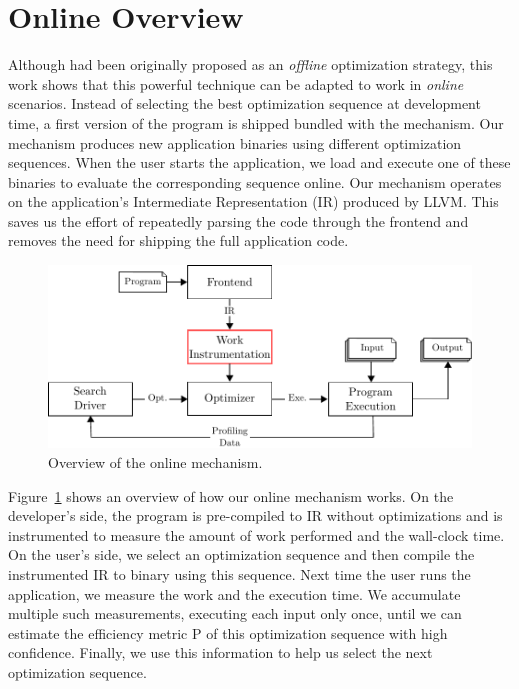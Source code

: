 \section{Online {\IterComp} Overview} \label{sec:oic-infra}

Although {\itercomp} had been originally proposed as an \textit{offline} optimization strategy, this work shows that this powerful
technique can be adapted to work in \textit{online} scenarios. Instead of selecting the best optimization sequence at development time, a
first version of the program is shipped bundled with the {\itercomp} mechanism. Our mechanism produces new application binaries using
different optimization sequences. When the user starts the application, we load and execute one of these binaries to evaluate the
corresponding sequence online. Our mechanism operates on the application's Intermediate Representation (IR) produced by LLVM. This saves us
the effort of repeatedly parsing the code through the frontend and removes the need for shipping the full application code.

\begin{figure}[t]
    \centering
    \includegraphics[width=\linewidth]{figs/infra-diagram}
    \caption{Overview of the online \itercomp mechanism.}
    \label{fig:infra-diagram}
\end{figure}

Figure~\ref{fig:infra-diagram} shows an overview of how our online {\itercomp} mechanism works. On the developer's side, the program is
pre-compiled to IR without optimizations and is instrumented to measure the amount of work performed and the wall-clock time. On the user's
side, we select an optimization sequence and then compile the instrumented IR to binary using this sequence. Next time the user runs the
application, we measure the work and the execution time. We accumulate multiple such measurements, executing each input only once, until we
can estimate the efficiency metric P of this optimization sequence with high confidence. Finally, we use this information to help us select
the next optimization sequence.

